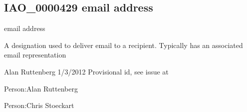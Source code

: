\documentclass[letterpaper,10pt,english]{sphinxmanual}
\begin{document}
\subsection{IAO\_0000429 \sphinxhyphen{} email address}
\label{\detokenize{doc-IAO_0000429:iao-0000429-email-address}}\label{\detokenize{doc-IAO_0000429:index-0}}\label{\detokenize{doc-IAO_0000429::doc}}
\begin{sphinxShadowBox}

\sphinxAtStartPar
email address
\end{sphinxShadowBox}

\begin{sphinxShadowBox}

\sphinxAtStartPar
{\hyperref[\detokenize{doc-IAO_0000030::doc}]{}}
\end{sphinxShadowBox}

\begin{sphinxShadowBox}

\sphinxAtStartPar
A designation used to deliver email to a recipient.  Typically has an associated email representation
\end{sphinxShadowBox}

\begin{sphinxShadowBox}

\sphinxAtStartPar
Alan Ruttenberg 1/3/2012 \sphinxhyphen{} Provisional id, see issue at 
\end{sphinxShadowBox}

\begin{sphinxShadowBox}

\sphinxAtStartPar
{}
\end{sphinxShadowBox}

\begin{sphinxShadowBox}

\sphinxAtStartPar
Person:Alan Ruttenberg

\sphinxAtStartPar
Person:Chris Stoeckart
\end{sphinxShadowBox}
\begin{quote}

\ignorespaces \end{quote}
\end{document}
